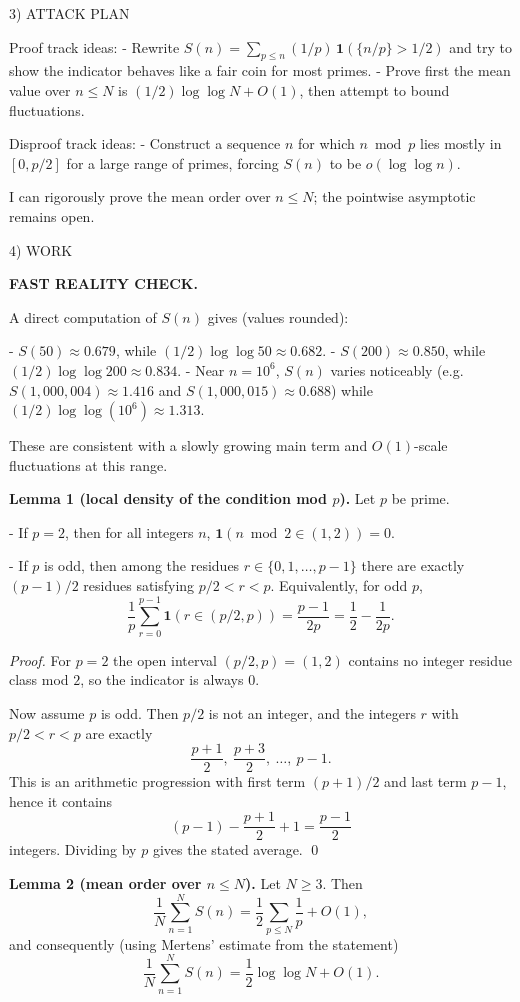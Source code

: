 3) ATTACK PLAN

Proof track ideas:
- Rewrite $S(n)=\sum_{p\le n}(1/p)\,\mathbf 1(\{n/p\}>1/2)$ and try to show the indicator behaves like a fair coin for most primes.
- Prove first the mean value over $n\le N$ is $(1/2)\log\log N+O(1)$, then attempt to bound fluctuations.

Disproof track ideas:
- Construct a sequence $n$ for which $n\bmod p$ lies mostly in $[0,p/2]$ for a large range of primes, forcing $S(n)$ to be $o(\log\log n)$.

I can rigorously prove the mean order over $n\le N$; the pointwise asymptotic remains open.

4) WORK

\textbf{FAST REALITY CHECK.}

A direct computation of $S(n)$ gives (values rounded):

- $S(50)\approx 0.679$, while $(1/2)\log\log 50\approx 0.682$.
- $S(200)\approx 0.850$, while $(1/2)\log\log 200\approx 0.834$.
- Near $n=10^6$, $S(n)$ varies noticeably (e.g. $S(1{,}000{,}004)\approx 1.416$ and $S(1{,}000{,}015)\approx 0.688$) while $(1/2)\log\log(10^6)\approx 1.313$.

These are consistent with a slowly growing main term and $O(1)$-scale fluctuations at this range.

\medskip

\textbf{Lemma 1 (local density of the condition mod $p$).}
Let $p$ be prime.

- If $p=2$, then for all integers $n$, $\mathbf 1(n\bmod 2\in(1,2))=0$.

- If $p$ is odd, then among the residues $r\in\{0,1,\dots,p-1\}$ there are exactly $(p-1)/2$ residues satisfying $p/2<r<p$.
Equivalently, for odd $p$,
\[
\frac{1}{p}\sum_{r=0}^{p-1} \mathbf 1(r\in(p/2,p)) = \frac{p-1}{2p} = \frac12-\frac{1}{2p}.
\]

\emph{Proof.}
For $p=2$ the open interval $(p/2,p)=(1,2)$ contains no integer residue class mod $2$, so the indicator is always $0$.

Now assume $p$ is odd. Then $p/2$ is not an integer, and the integers $r$ with $p/2<r<p$ are exactly
\[
\frac{p+1}{2},\ \frac{p+3}{2},\ \dots,\ p-1.
\]
This is an arithmetic progression with first term $(p+1)/2$ and last term $p-1$, hence it contains
\[
(p-1) - \frac{p+1}{2} + 1 = \frac{p-1}{2}
\]
integers.
Dividing by $p$ gives the stated average.
\qed

\medskip

\textbf{Lemma 2 (mean order over $n\le N$).}
Let $N\ge 3$. Then
\[
\frac{1}{N}\sum_{n=1}^N S(n) = \frac12\sum_{p\le N}\frac{1}{p} + O(1),
\]
and consequently (using Mertens' estimate from the statement)
\[
\frac{1}{N}\sum_{n=1}^N S(n) = \frac12\log\log N + O(1).
\]

